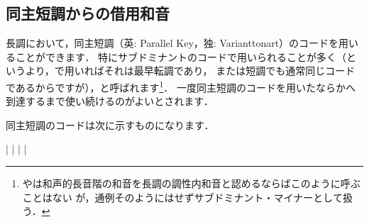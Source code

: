 \documentclass[dvipdfmx,uplatex,b5paper,openany,jbase=12Q,nomag*,textwidth-limit=44%
               ]{gachimuchi}[2020/05/05]
\begin{document}
\subsection{同主短調からの借用和音}
長調において，同主短調（英: Parallel Key，独: Varianttonart）のコードを用いることができます．
特にサブドミナントのコードで用いられることが多く（というより，\Gni で用いればそれは最早転調であり，
また\Gnv は短調でも通常同じコードであるからですが），と呼ばれます\footnote{%
  \Gniv\Min や\Gnii\Dimt は和声的長音階の和音を長調の調性内和音と認めるならばこのように呼ぶことはない%
  が，通例そのようにはせずサブドミナント・マイナーとして扱う．
}．
一度同主短調のコードを用いたなら\Gni か\Gnv へ到達するまで使い続けるのがよいとされます．


同主短調のコードは次に示すものになります．
\begin{Music}
  \nostartrule%
  \Startpiece%
  \Notes
  \en\bar
  \Notes{}%
  \sk%
  \sk%
  \sk%
  \sk%
  \en\bar
  \Notes{}%
  \sk%
  \sk%
  \en\setdoublebar
  \endpiece%
  \Startpiece%
  \Notes
  \en\bar
  \Notes{}%
  \sk%
  \sk%
  \en\bar
  \Notes{}%
  \sk%
  \en\setdoublebar
  \endpiece%
\end{Music}
\end{document}
